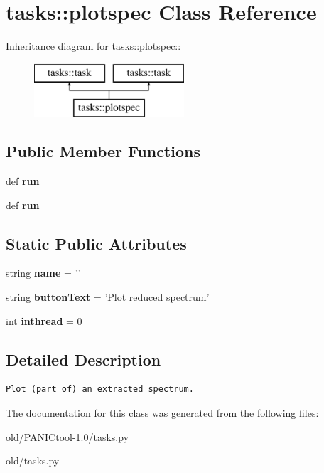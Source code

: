 \section{tasks::plotspec Class Reference}
\label{classtasks_1_1plotspec}
Inheritance diagram for tasks::plotspec::\begin{figure}[H]
\begin{center}
\leavevmode
\includegraphics[height=2cm]{classtasks_1_1plotspec}
\end{center}
\end{figure}
\subsection*{Public Member Functions}
\begin{CompactItemize}
\item 
def \textbf{run}\label{classtasks_1_1plotspec_2ec7ebb6665b3d10b3a687b9666a323b}

\item 
def \textbf{run}\label{classtasks_1_1plotspec_2ec7ebb6665b3d10b3a687b9666a323b}

\end{CompactItemize}
\subsection*{Static Public Attributes}
\begin{CompactItemize}
\item 
string \textbf{name} = '{\bfplotspec}'\label{classtasks_1_1plotspec_7c593740af4fa1d7488bab919fe923c9}

\item 
string \textbf{button\-Text} = 'Plot reduced spectrum'\label{classtasks_1_1plotspec_046297279c378a693ed8e6122d8b84cb}

\item 
int \textbf{inthread} = 0\label{classtasks_1_1plotspec_cffba8dccd1d76c830747d71462c4681}

\end{CompactItemize}


\subsection{Detailed Description}


\footnotesize\begin{verbatim}Plot (part of) an extracted spectrum.
\end{verbatim}
\normalsize
 



The documentation for this class was generated from the following files:\begin{CompactItemize}
\item 
old/PANICtool-1.0/tasks.py\item 
old/tasks.py\end{CompactItemize}
